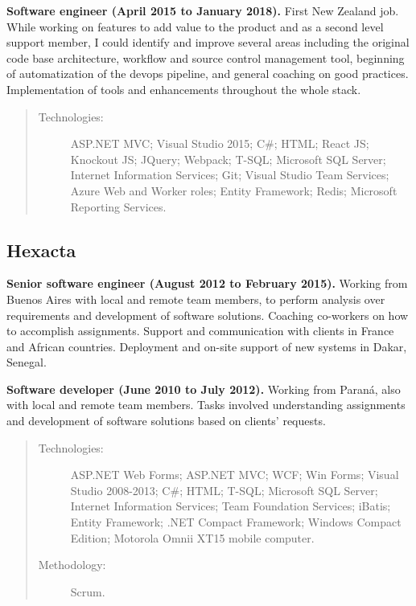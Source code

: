 \textbf{Software engineer (April 2015 to January 2018).} First New Zealand job. While working on features to add value to the product and as a second level support member, I could identify and improve several areas including the original code base architecture, workflow and source control management tool, beginning of automatization of the devops pipeline, and general coaching on good practices. Implementation of tools and enhancements throughout the whole stack.

\begin{quote}
\begin{description}
    \item[Technologies:] ASP.NET MVC; Visual Studio 2015; C\#; HTML; React JS; Knockout JS; JQuery; Webpack; T-SQL; Microsoft SQL Server; Internet Information Services; Git; Visual Studio Team Services; Azure Web and Worker roles; Entity Framework; Redis; Microsoft Reporting Services.
\end{description}
\end{quote}

\subsection*{Hexacta}

\textbf{Senior software engineer (August 2012 to February 2015).} Working from Buenos Aires with local and remote team members, to perform analysis over requirements and development of software solutions. Coaching co-workers on how to accomplish assignments. Support and communication with clients in France and African countries. Deployment and on-site support of new systems in Dakar, Senegal.
\par
\bigskip
\textbf{Software developer (June 2010 to July 2012).} Working from Paraná, also with local and remote team members. Tasks involved understanding assignments and development of software solutions based on clients' requests.

\begin{quote}
\begin{description}
    \item[Technologies:] ASP.NET Web Forms; ASP.NET MVC; WCF; Win Forms; Visual Studio 2008-2013; C\#; HTML; T-SQL; Microsoft SQL Server; Internet Information Services; Team Foundation Services; iBatis; Entity Framework; .NET Compact Framework; Windows Compact Edition; Motorola Omnii XT15 mobile computer.
    \item[Methodology:] Scrum.
\end{description}
\end{quote}


